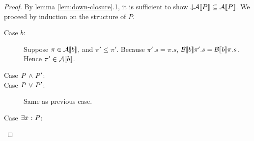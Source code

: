 \documentclass[11pt]{report}
\begin{document}
\begin{proof}
	By lemma \ref{lem:down-closure}.1, it is sufficient to show $\operatorname{\downarrow}\!\mathcal{A}[\![P]\!] \subseteq \mathcal{A}[\![P]\!]$. We proceed by induction on the structure of $P$. 
	\begin{description}
		
		\item[Case $b$:] Suppose $\pi \in \mathcal{A}[\![b]\!]$, and $\pi' \leq \pi'$. Because $\pi'.s = \pi.s$, $\mathcal{B}[\![b]\!]\pi'.s = \mathcal{B}[\![b]\!]\pi.s$. Hence $\pi' \in \mathcal{A}[\![b]\!]$.
		
		\item[Case $P \operatorname{\,\wedge\,} P'$:] 
		
		
		\item[Case $P \operatorname{\,\vee\,} P'$:] Same as previous case. 
		
		\item[Case $\exists x \operatorname{\,:\,} P$:] 
		
\end{description}
\end{proof}
\end{document}
